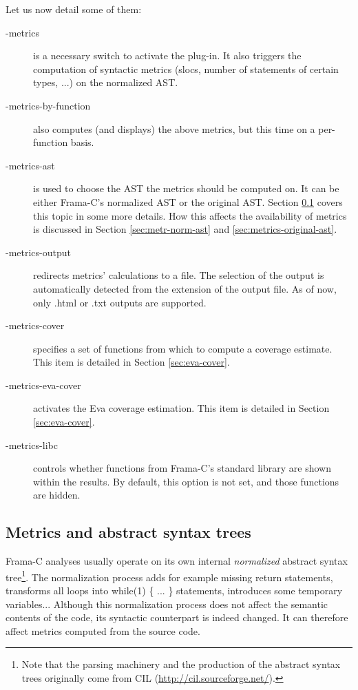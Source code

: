 \documentclass{frama-c-book}
\begin{document}
Let us now detail some of them:
\begin{description}
\item[-metrics] is a necessary switch to activate the plug-in. It also triggers
  the computation of syntactic metrics (slocs, number of statements
  of certain types, ...) on the normalized AST.

\item[-metrics-by-function] also computes (and displays) the above metrics, but
  this time on a per-function basis.

\item[-metrics-ast] is used to choose the AST the metrics should be computed
  on. It can be either Frama-C's normalized AST or the original AST. Section
  \ref{sec:metr-abstr-synt} covers this topic in some more details. How this
  affects the availability of metrics is discussed in Section
  \ref{sec:metr-norm-ast} and \ref{sec:metrics-original-ast}.

\item[-metrics-output] redirects metrics' calculations to a file. The selection
  of the output is automatically detected from the extension of the output
  file. As of now, only {\sf .html} or {\sf .txt} outputs are supported.

\item[-metrics-cover] specifies a set of functions from which to compute a
coverage estimate. This item is detailed in Section \ref{sec:eva-cover}.

\item[-metrics-eva-cover] activates the Eva coverage estimation.
  This item is detailed in Section \ref{sec:eva-cover}.

\item[-metrics-libc] controls whether functions from Frama-C's standard
  library are shown within the results. By default, this option is not set,
  and those functions are hidden.


\end{description}

\subsection{Metrics and abstract syntax trees}
\label{sec:metr-abstr-synt}
Frama-C analyses usually operate on its own internal {\em normalized} abstract syntax
tree\footnote{Note that the parsing machinery and the production of the abstract
  syntax trees originally come from CIL (\url{http://cil.sourceforge.net/}).}.
The normalization process
adds for example missing return statements, transforms all loops into while(1) \{ ... \}
statements, introduces some temporary variables...
Although this normalization process does not affect the semantic contents of the
code, its syntactic counterpart is indeed changed. It can therefore affect
metrics computed from the source code.
\end{document}
